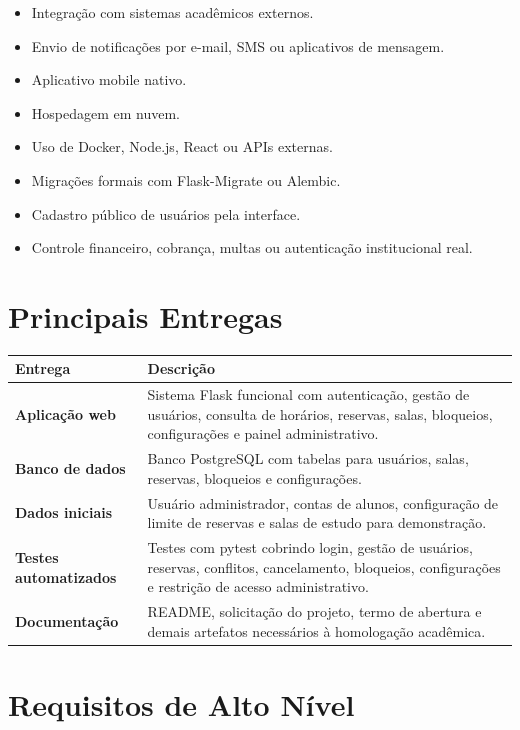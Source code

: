 \documentclass[12pt,a4paper]{article}
\begin{document}
\begin{itemize}
    \item Integração com sistemas acadêmicos externos.
    \item Envio de notificações por e-mail, SMS ou aplicativos de mensagem.
    \item Aplicativo mobile nativo.
    \item Hospedagem em nuvem.
    \item Uso de Docker, Node.js, React ou APIs externas.
    \item Migrações formais com Flask-Migrate ou Alembic.
    \item Cadastro público de usuários pela interface.
    \item Controle financeiro, cobrança, multas ou autenticação institucional real.
\end{itemize}

\section{Principais Entregas}

\begin{longtable}{|p{5cm}|p{10cm}|}
\hline
\textbf{Entrega} & \textbf{Descrição} \\ \hline
\textbf{Aplicação web} & Sistema Flask funcional com autenticação, gestão de usuários, consulta de horários, reservas, salas, bloqueios, configurações e painel administrativo. \\ \hline
\textbf{Banco de dados} & Banco PostgreSQL com tabelas para usuários, salas, reservas, bloqueios e configurações. \\ \hline
\textbf{Dados iniciais} & Usuário administrador, contas de alunos, configuração de limite de reservas e salas de estudo para demonstração. \\ \hline
\textbf{Testes automatizados} & Testes com pytest cobrindo login, gestão de usuários, reservas, conflitos, cancelamento, bloqueios, configurações e restrição de acesso administrativo. \\ \hline
\textbf{Documentação} & README, solicitação do projeto, termo de abertura e demais artefatos necessários à homologação acadêmica. \\ \hline
\end{longtable}

\section{Requisitos de Alto Nível}
\end{document}
